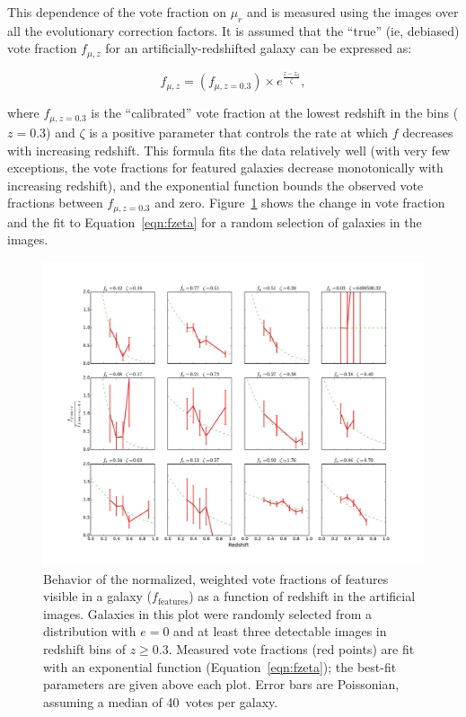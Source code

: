 \documentclass[twocolumn]{aastex6}
\begin{document}
This dependence of the vote fraction on $\mu_r$ and \zsim{} is measured using the
\ferengi{} images over all the evolutionary correction factors. It is assumed
that the ``true'' (ie, debiased) vote fraction $f_{\mu,z}$ for an
artificially-redshifted galaxy can be expressed as:

\begin{equation}
f_{\mu,z} = \left(f_{\mu,z=0.3}\right) \times e^{{\frac{z-z_0}{\zeta}}},
\label{eqn:fzeta}
\end{equation}

\noindent where $f_{\mu,z=0.3}$ is the ``calibrated'' vote fraction at the
lowest redshift in the \ferengi{} bins ($z=0.3$) and $\zeta$ is a positive
parameter that controls the rate at which $f$ decreases with increasing
redshift. This formula fits the data relatively well (with very few exceptions,
the vote fractions for featured galaxies decrease monotonically with increasing
redshift), and the exponential function bounds the observed vote fractions
between $f_{\mu,z=0.3}$ and zero. Figure~\ref{fig:zeta_examples} shows the
change in vote fraction and the fit to Equation~\ref{eqn:fzeta} for a random
selection of galaxies in the \ferengi{} images. 

\begin{figure}
\center
\includegraphics[width=\textwidth]{figures/zeta_examples.pdf}
\caption{Behavior of the normalized, weighted vote fractions of features
visible in a galaxy ($f_\textrm{features}$) as a function of redshift in the
artificial \ferengi{} images. Galaxies in this plot were randomly selected from
a distribution with $e=0$ and at least three detectable images in redshift bins
of $z\ge0.3$. Measured vote fractions (red points) are fit with an exponential
function (Equation~\ref{eqn:fzeta}); the best-fit parameters are given above
each plot. Error bars are Poissonian, assuming a median of 40~votes per
galaxy.}
\label{fig:zeta_examples}
\end{figure}
\end{document}
